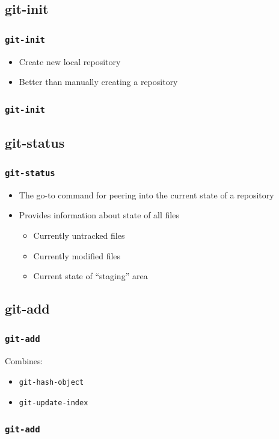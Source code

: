 \documentclass{beamer}
\begin{document}
\subsection{git-init}
\begin{frame}
\frametitle{\texttt{git-init}}
\begin{itemize}
\item{Create new local repository}
\item{Better than manually creating a repository}
\end{itemize}
\end{frame}

\begin{frame}[fragile]
\frametitle{\texttt{git-init}}

\end{frame}

\subsection{git-status}
\begin{frame}
\frametitle{\texttt{git-status}}
\begin{itemize}
\item{The go-to command for peering into the current state of a repository}
\item{Provides information about state of all files}
\begin{itemize}
\item{Currently untracked files}
\item{Currently modified files}
\item{Current state of ``staging'' area}
\end{itemize}
\end{itemize}
\end{frame}

\subsection{git-add}
\begin{frame}
\frametitle{\texttt{git-add}}
Combines:
\begin{itemize}
\item{\texttt{git-hash-object}}
\item{\texttt{git-update-index}}
\end{itemize}
\end{frame}

\begin{frame}[fragile]
\frametitle{\texttt{git-add}}

\end{frame}
\end{document}
